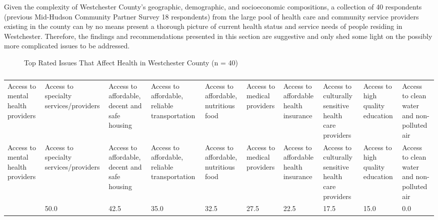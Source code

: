 \documentclass[
  english,
  letterpaper,
]{report}
\begin{document}
Given the complexity of Westchester County's geographic, demographic,
and socioeconomic compositions, a collection of 40 respondents (previous
Mid-Hudson Community Partner Survey 18 respondents) from the large pool
of health care and community service providers existing in the county
can by no means present a thorough picture of current health status and
service needs of people residing in Westchester. Therefore, the findings
and recommendations presented in this section are suggestive and only
shed some light on the possibly more complicated issues to be addressed.

\begin{figure}


\caption{\label{fig-wc-affect-health}Top Rated Issues That Affect Health
in Westchester County (n = 40)}

\end{figure}%

\begin{longtable}[]{@{}llllllllll@{}}

\caption{\label{tbl-wc-affect-health}Top Rated Issues That Affect Health
in Westchester County (n = 40)}

\tabularnewline

\caption{}\label{T_71ad4}\tabularnewline
\toprule\noalign{}
Access to mental health providers & Access to specialty
services/providers & Access to affordable, decent and safe housing &
Access to affordable, reliable transportation & Access to affordable,
nutritious food & Access to medical providers & Access to affordable
health insurance & Access to culturally sensitive health care providers
& Access to high quality education & Access to clean water and
non-polluted air \\
\midrule\noalign{}
\endfirsthead
\toprule\noalign{}
Access to mental health providers & Access to specialty
services/providers & Access to affordable, decent and safe housing &
Access to affordable, reliable transportation & Access to affordable,
nutritious food & Access to medical providers & Access to affordable
health insurance & Access to culturally sensitive health care providers
& Access to high quality education & Access to clean water and
non-polluted air \\
\midrule\noalign{}
\endhead
\bottomrule\noalign{}
\endlastfoot
57.5 & 50.0 & 42.5 & 35.0 & 32.5 & 27.5 & 22.5 & 17.5 & 15.0 & 0.0 \\

\end{longtable}
\end{document}
